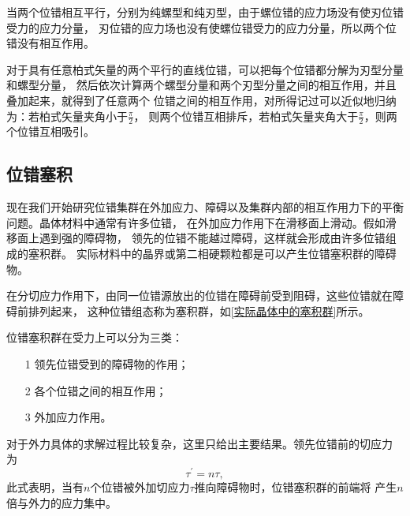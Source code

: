                     当两个位错相互平行，分别为纯螺型和纯刃型，由于螺位错的应力场没有使刃位错受力的应力分量，
                    刃位错的应力场也没有使螺位错受力的应力分量，所以两个位错没有相互作用。

                    对于具有任意柏式矢量的两个平行的直线位错，可以把每个位错都分解为刃型分量和螺型分量，
                    然后依次计算两个螺型分量和两个刃型分量之间的相互作用，并且叠加起来，就得到了任意两个
                    位错之间的相互作用，对所得记过可以近似地归纳为：若柏式矢量夹角小于$\frac{\pi}{2}$，
                    则两个位错互相排斥，若柏式矢量夹角大于$\frac{\pi}{2}$，则两个位错互相吸引。
            \subsection{位错塞积}
                现在我们开始研究位错集群在外加应力、障碍以及集群内部的相互作用力下的平衡问题。晶体材料中通常有许多位错，
                在外加应力作用下在滑移面上滑动。假如滑移面上遇到强的障碍物，
                领先的位错不能越过障碍，这样就会形成由许多位错组成的塞积群。
                实际材料中的晶界或第二相硬颗粒都是可以产生位错塞积群的障碍物。

                在分切应力作用下，由同一位错源放出的位错在障碍前受到阻碍，这些位错就在障碍前排列起来，
                这种位错组态称为塞积群，如\autoref{实际晶体中的塞积群}所示。

                位错塞积群在受力上可以分为三类：
                \begin{itemize}
                    \item[1] 领先位错受到的障碍物的作用；
                    \item[2] 各个位错之间的相互作用；
                    \item[3] 外加应力作用。
                \end{itemize}

                对于外力具体的求解过程比较复杂，这里只给出主要结果。领先位错前的切应力
                为
                \begin{equation}
                    \tau^{\prime}=n\tau,
                \end{equation}
                此式表明，当有$n$个位错被外加切应力$\tau$推向障碍物时，位错塞积群的前端将
                产生$n$倍与外力的应力集中。

